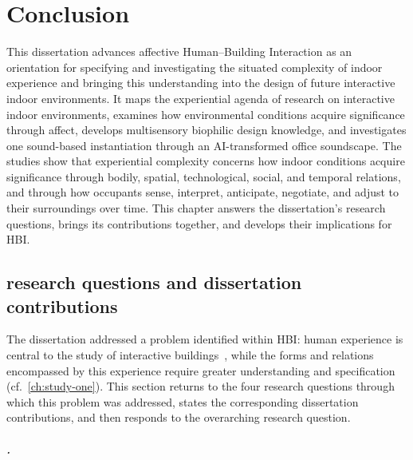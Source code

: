 \chapter{Conclusion}
\label{ch:conclusion}

\openingpara
{This dissertation advances affective Human--Building Interaction} {as an orientation for specifying and investigating the situated complexity of indoor experience and bringing this understanding into the design of future interactive indoor environments. It maps the experiential agenda of research on interactive indoor environments, examines how environmental conditions acquire significance through affect, develops multisensory biophilic design knowledge, and investigates one sound-based instantiation through an AI-transformed  office soundscape. The studies show that experiential complexity concerns how indoor conditions acquire significance through bodily, spatial, technological, social, and temporal relations, and through how occupants sense, interpret, anticipate, negotiate, and adjust to their surroundings over time.  This chapter answers the dissertation's research questions, brings its contributions together, and develops their implications for HBI.}

\section{research questions and dissertation contributions}
\label{sec:returning-problem}

The dissertation addressed a problem identified within HBI: human experience is central to the study of interactive buildings~\cite{alavi2019introduction,rao2023towards}, while the forms and relations encompassed by this experience require greater understanding and specification~\cite{rao2025smart} (cf.~\autoref{ch:study-one}). This section returns to the four research questions through which this problem was addressed, states the corresponding dissertation contributions, and then responds to the overarching research question.

\paragraph{.}

